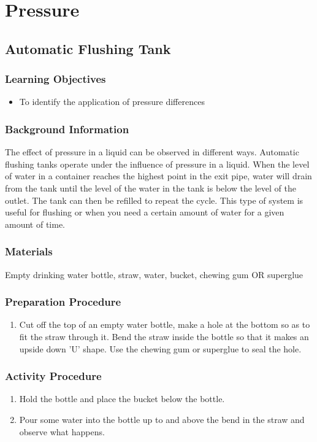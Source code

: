 \section{Pressure}

\subsection{Automatic Flushing Tank}

\subsubsection*{Learning Objectives}
\begin{itemize}
\item{To identify the application of pressure differences}
\end{itemize}

\subsubsection*{Background Information}
The effect of pressure in a liquid can be observed in different ways. Automatic flushing tanks operate under the influence of pressure in a liquid. When the level of water in a container reaches the highest point in the exit pipe, water will drain from the tank until the level of the water in the tank is below the level of the outlet. The tank can then be refilled to repeat the cycle. This type of system is useful for flushing or when you need a certain amount of water for a given amount of time.

\subsubsection*{Materials}
Empty drinking water bottle, straw, water, bucket, chewing gum OR superglue

\subsubsection*{Preparation Procedure}
\begin{enumerate}
\item{Cut off the top of an empty water bottle, make a hole at the bottom so as to fit the straw through it. 
Bend the straw inside the bottle so that it makes an upside down 'U' shape. Use the chewing gum or superglue to seal the hole.} 
\end{enumerate}

\subsubsection*{Activity Procedure}
\begin{enumerate}
\item{Hold the bottle and place the bucket below the bottle.} 
\item{Pour some water into the bottle up to and above the bend in the straw and observe what happens.} 
\end{enumerate}

